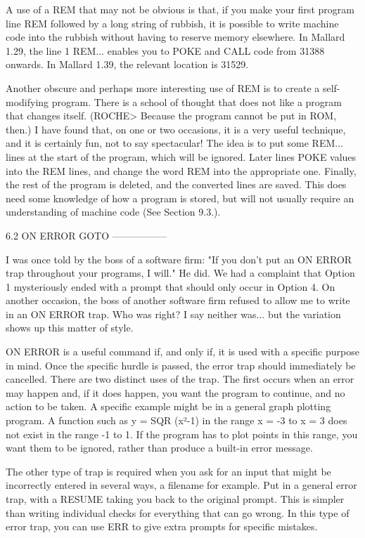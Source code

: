 A use of a REM that may not be obvious is that, if you make your first program 
line REM followed by a long string of rubbish, it is possible to write machine 
code  into the rubbish without having to reserve memory elsewhere. In  Mallard 
1.29, the line 1 REM... enables you to POKE and CALL code from 31388  onwards. 
In Mallard 1.39, the relevant location is 31529.

Another  obscure and perhaps more interesting use of REM is to create a  self-
modifying  program. There is a school of thought that does not like a  program 
that changes itself. (ROCHE> Because the program cannot be put in ROM,  then.) 
I have found that, on one or two occasions, it is a very useful technique, and 
it  is certainly fun, not to say spectacular! The idea is to put  some  REM... 
lines  at  the start of the program, which will be ignored. Later  lines  POKE 
values  into the REM lines, and change the word REM into the appropriate  one. 
Finally,  the  rest  of the program is deleted, and the  converted  lines  are 
saved. This does need some knowledge of how a program is stored, but will  not 
usually require an understanding of machine code (See Section 9.3.).


6.2 ON ERROR GOTO
-----------------

I was once told by the boss of a software firm: "If you don't put an ON  ERROR 
trap throughout your programs, I will." He did. We had a complaint that Option 
1  mysteriously  ended with a prompt that should only occur in  Option  4.  On 
another  occasion,  the boss of another software firm refused to allow  me  to 
write  in  an  ON  ERROR trap. Who was right? I say  neither  was...  but  the 
variation shows up this matter of style.

ON  ERROR  is  a useful command if, and only if, it is used  with  a  specific 
purpose  in  mind. Once the specific hurdle is passed, the error  trap  should 
immediately  be cancelled. There are two distinct uses of the trap. The  first 
occurs  when an error may happen and, if it does happen, you want the  program 
to  continue,  and  no action to be taken. A specific example might  be  in  a 
general graph plotting program. A function such as y = SQR (x²-1) in the range 
x  =  -3 to x = 3 does not exist in the range -1 to 1. If the program  has  to 
plot points in this range, you want them to be ignored, rather than produce  a 
built-in error message.

The  other  type of trap is required when you ask for an input that  might  be 
incorrectly entered in several ways, a filename for example. Put in a  general 
error  trap,  with a RESUME taking you back to the original  prompt.  This  is 
simpler  than writing individual checks for everything that can go  wrong.  In 
this  type of error trap, you can use ERR to give extra prompts  for  specific 
mistakes.

